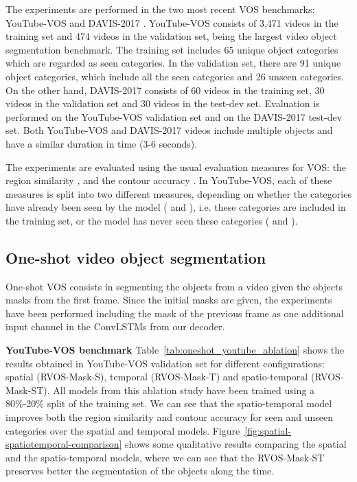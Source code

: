 \documentclass[10pt,twocolumn,letterpaper]{article}
\begin{document}
The experiments are performed in the two most recent VOS benchmarks: YouTube-VOS \cite{xu2018youtube-benchmark} and DAVIS-2017 \cite{Pont-Tuset_arXiv_2017}. YouTube-VOS consists of 3,471 videos in the training set and 474 videos in the validation set, being the largest video object segmentation benchmark. The training set includes 65 unique object categories which are regarded as seen categories. In the validation set,  there are 91 unique object categories, which include all the seen categories and 26 unseen categories. On the other hand, DAVIS-2017 consists of 60 videos in the training set, 30 videos in the validation set and 30 videos in the test-dev set. Evaluation is performed on the YouTube-VOS validation set and on the DAVIS-2017 test-dev set. Both YouTube-VOS and DAVIS-2017 videos include multiple objects and have a similar duration in time (3-6 seconds).


The experiments are evaluated using the usual evaluation measures for VOS:  the region similarity , and  the contour accuracy . In YouTube-VOS, each of these measures is split into two different measures, depending on whether the categories have already been seen by the model ( and ), i.e. these categories are included in the training set, or the model has never seen these categories ( and ).

\subsection{One-shot video object segmentation}



One-shot VOS consists in segmenting the objects from a video given the objects masks from the first frame. Since the initial masks are given, the experiments have been performed including the mask of the previous frame as one additional input channel in the ConvLSTMs from our decoder. 

\textbf{YouTube-VOS benchmark} Table~\ref{tab:oneshot_youtube_ablation} shows the results obtained in YouTube-VOS validation set for different configurations: spatial (RVOS-Mask-S), temporal (RVOS-Mask-T) and spatio-temporal (RVOS-Mask-ST). All models from this ablation study have been trained using a 80\%-20\% split of the training set. We can see that the spatio-temporal model improves both the region similarity  and contour accuracy  for seen and unseen categories over the spatial and temporal models. Figure~\ref{fig:spatial-spatiotemporal-comparison} shows some qualitative results comparing the spatial and the spatio-temporal models, where we can see that the RVOS-Mask-ST preserves better the segmentation of the objects along the time.
\end{document}

